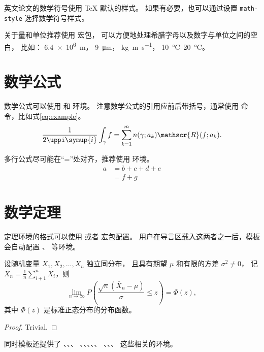 英文论文的数学符号使用 \TeX{} 默认的样式。
如果有必要，也可以通过设置 \verb|math-style| 选择数学符号样式。

关于量和单位推荐使用
\href{http://mirrors.ctan.org/macros/latex/contrib/siunitx/siunitx.pdf}{}
宏包，
可以方便地处理希腊字母以及数字与单位之间的空白，
比如：
\SI{6.4e6}{m}，
\SI{9}{\micro\meter}，
\si{kg.m.s^{-1}}，
\SIrange{10}{20}{\degreeCelsius}。



\section{数学公式}

数学公式可以使用  和  环境。
注意数学公式的引用应前后带括号，通常使用  命令，比如式\eqref{eq:example}。
\begin{equation}
  \frac{1}{2 \uppi \symup{i}} \int_\gamma f = \sum_{k=1}^m n(\gamma; a_k) \mathscr{R}(f; a_k).
  \label{eq:example}
\end{equation}

多行公式尽可能在“=”处对齐，推荐使用  环境。
\begin{align}
  a & = b + c + d + e \\
    & = f + g
\end{align}



\section{数学定理}

定理环境的格式可以使用  或者  宏包配置。
用户在导言区载入这两者之一后，模板会自动配置 、 等环境。

\begin{theorem}
  设随机变量 $X_1, X_2, \dots, X_n$ 独立同分布， 且具有期望 $\mu$ 和有限的方差 $\sigma^2 \ne 0$，
  记 $\bar{X}_n = \frac{1}{n} \sum_{i+1}^n X_i$，则
  \begin{equation}
    \lim_{n \to \infty} P \left(\frac{\sqrt{n} \left( \bar{X}_n - \mu \right)}{\sigma} \le z \right) = \Phi(z),
  \end{equation}
  其中 $\Phi(z)$ 是标准正态分布的分布函数。
\end{theorem}
\begin{proof}
  Trivial.
\end{proof}

同时模板还提供了 、、、
、、、、、
、、、 这些相关的环境。
\fi
